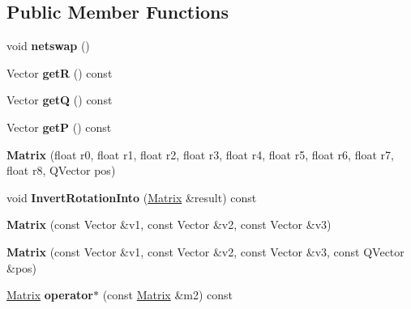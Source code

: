 \subsection*{Public Member Functions}
\begin{DoxyCompactItemize}
\item 
void {\bfseries netswap} ()\hypertarget{classMatrix_aeb1914f4e362151f28d99ec75d454324}{}\label{classMatrix_aeb1914f4e362151f28d99ec75d454324}

\item 
Vector {\bfseries getR} () const \hypertarget{classMatrix_a3d076ab703d76ec62bb24e57932d7860}{}\label{classMatrix_a3d076ab703d76ec62bb24e57932d7860}

\item 
Vector {\bfseries getQ} () const \hypertarget{classMatrix_a3c80a2d5d6ea84d5ac5c1fff92abf3ca}{}\label{classMatrix_a3c80a2d5d6ea84d5ac5c1fff92abf3ca}

\item 
Vector {\bfseries getP} () const \hypertarget{classMatrix_acd8f2a690685de5e3c6627092c6761fc}{}\label{classMatrix_acd8f2a690685de5e3c6627092c6761fc}

\item 
{\bfseries Matrix} (float r0, float r1, float r2, float r3, float r4, float r5, float r6, float r7, float r8, Q\+Vector pos)\hypertarget{classMatrix_a49420b57d0a37977823a6137fcea80a3}{}\label{classMatrix_a49420b57d0a37977823a6137fcea80a3}

\item 
void {\bfseries Invert\+Rotation\+Into} (\hyperlink{classMatrix}{Matrix} \&result) const \hypertarget{classMatrix_a5a80857bd111d7c32f13e2ac361f4102}{}\label{classMatrix_a5a80857bd111d7c32f13e2ac361f4102}

\item 
{\bfseries Matrix} (const Vector \&v1, const Vector \&v2, const Vector \&v3)\hypertarget{classMatrix_a95c1e29ca70d8cadbcf55c6a86fbf837}{}\label{classMatrix_a95c1e29ca70d8cadbcf55c6a86fbf837}

\item 
{\bfseries Matrix} (const Vector \&v1, const Vector \&v2, const Vector \&v3, const Q\+Vector \&pos)\hypertarget{classMatrix_a061542b86b8ae7a5677a73b3b0a80715}{}\label{classMatrix_a061542b86b8ae7a5677a73b3b0a80715}

\item 
\hyperlink{classMatrix}{Matrix} {\bfseries operator$\ast$} (const \hyperlink{classMatrix}{Matrix} \&m2) const \hypertarget{classMatrix_abe2c2f0a57084f74eda1cda177f2518e}{}\label{classMatrix_abe2c2f0a57084f74eda1cda177f2518e}

\end{DoxyCompactItemize}
